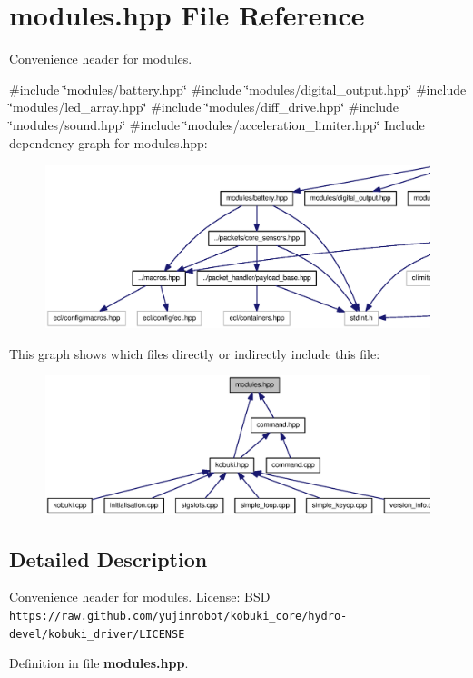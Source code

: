 \section{modules.\-hpp \-File \-Reference}
\label{modules_8hpp}


\-Convenience header for modules.  


{\ttfamily \#include \char`\"{}modules/battery.\-hpp\char`\"{}}\*
{\ttfamily \#include \char`\"{}modules/digital\-\_\-output.\-hpp\char`\"{}}\*
{\ttfamily \#include \char`\"{}modules/led\-\_\-array.\-hpp\char`\"{}}\*
{\ttfamily \#include \char`\"{}modules/diff\-\_\-drive.\-hpp\char`\"{}}\*
{\ttfamily \#include \char`\"{}modules/sound.\-hpp\char`\"{}}\*
{\ttfamily \#include \char`\"{}modules/acceleration\-\_\-limiter.\-hpp\char`\"{}}\*
\-Include dependency graph for modules.\-hpp\-:
\nopagebreak
\begin{figure}[H]
\begin{center}
\leavevmode
\includegraphics[width=350pt]{modules_8hpp__incl}
\end{center}
\end{figure}
\-This graph shows which files directly or indirectly include this file\-:
\nopagebreak
\begin{figure}[H]
\begin{center}
\leavevmode
\includegraphics[width=350pt]{modules_8hpp__dep__incl}
\end{center}
\end{figure}


\subsection{\-Detailed \-Description}
\-Convenience header for modules. \-License\-: \-B\-S\-D {\tt https\-://raw.\-github.\-com/yujinrobot/kobuki\-\_\-core/hydro-\/devel/kobuki\-\_\-driver/\-L\-I\-C\-E\-N\-S\-E} 

\-Definition in file {\bf modules.\-hpp}.

